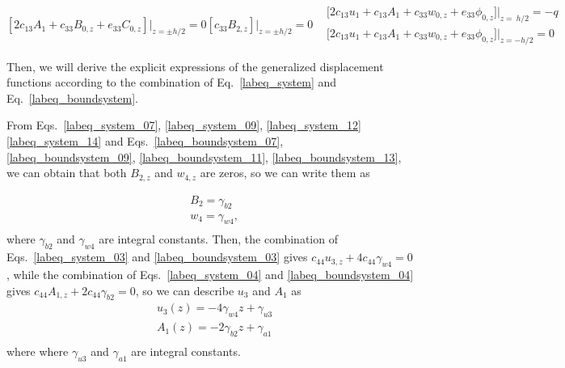 \documentclass[12pt,sort&compress,fleqn,3p]{elsarticle}
\newcommand{\er}[4]{{#1}_{#2}{#3}_{#4}}
\newcommand{\de}[5]{{#1}_{#2}{#3}_{{#4},{#5}}}
\begin{document}
\begin{subequations}
\begin{equation}
[2\er{c}{13}{A}{1}+\de{c}{33}{B}{0}{z}+\de{e}{33}{C}{0}{z}]\big|_{z=\pm h/2}=0
\end{equation}
\begin{equation}\label{labeq_boundsystem_13}
[c_{33}B_{2,z}]\big|_{z=\pm h/2}=0
\end{equation}
\begin{equation}\label{labeq_boundsystem_14}
\begin{split}
&\big[2c_{13}u_{1}+c_{13}A_{1}+c_{33}w_{0,z}+\de{e}{33}{\phi}{0}{z}\big]\Big|_{z=~h/2}= -q\\
&\big[2c_{13}u_{1}+c_{13}A_{1}+c_{33}w_{0,z}+\de{e}{33}{\phi}{0}{z}\big]\Big|_{z=-h/2}= 0
\end{split}
\end{equation}
\end{subequations}


Then, we will derive the explicit expressions of the generalized displacement functions  according to the combination of Eq.~\eqref{labeq_system} and  Eq.~\eqref{labeq_boundsystem}.

From  Eqs.~\eqref{labeq_system_07}, \eqref{labeq_system_09}, \eqref{labeq_system_12} \eqref{labeq_system_14} and Eqs.~\eqref{labeq_boundsystem_07}, \eqref{labeq_boundsystem_09}, \eqref{labeq_boundsystem_11}, \eqref{labeq_boundsystem_13}, we can  obtain that both $B_{2,z}$ and $w_{4,z}$ are zeros, so  we can write them as

\begin{equation}\label{labeq_w4B2}
\begin{split}
&B_{2}= \gamma_{b2}\\
&w_{4}= \gamma_{w4},\\
\end{split}
\end{equation}
where $\gamma_{b2}$ and $\gamma_{w4}$ are integral constants.   Then,   the combination of   Eqs.~\eqref{labeq_system_03} and  \eqref{labeq_boundsystem_03} gives $ c_{44}u_{3,z} + 4c_{44}\gamma_{w4} = 0 $, while the combination of   Eqs.~\eqref{labeq_system_04} and  \eqref{labeq_boundsystem_04}  gives   $ c_{44}A_{1,z} + 2c_{44}\gamma_{b2} = 0 $, so we can describe $u_{3}$  and $A_1$ as
\begin{equation}\label{labeq_u3A1}
\begin{split}
&u_{3}(z)=-4\gamma_{w4}z+\gamma_{u3}\\
&A_{1}(z)=-2\gamma_{b2}z+\gamma_{a1}\\
\end{split}
\end{equation}
where where $\gamma_{u3}$ and $\gamma_{a1}$ are integral constants.
\end{document}
